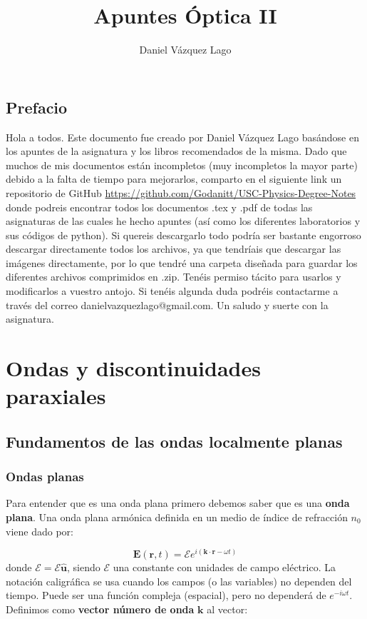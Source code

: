 \documentclass[12pt,a4paper]{book}
\title{Apuntes Óptica II}
\author{Daniel Vázquez Lago}
\numberwithin{equation}{section}
\numberwithin{figure}{section}
\newcommand{\1}{_{(1)}}
\newcommand{\2}{_{(2)}}
\newcommand{\un}{\mathbf{u}}
\newcommand{\rn}{\mathbf{r}}
\newcommand{\kn}{\mathbf{k}}
\newcommand{\En}{\mathbf{E}}
\newcommand{\Encal}{\boldsymbol{\mathcal{E}}}
\newcommand{\hnu}{\hat{\un}}
\theoremstyle{definition}
\begin{document}
\maketitle

\newpage

\tableofcontents

\newpage
\section*{Prefacio}

Hola a todos. Este documento fue creado por Daniel Vázquez Lago basándose en los apuntes de la asignatura y los libros recomendados de la misma. Dado que muchos de mis documentos están incompletos (muy incompletos la mayor parte) debido a la falta de tiempo para mejorarlos, comparto en el siguiente link un repositorio de GitHub \url{https://github.com/Godanitt/USC-Physics-Degree-Notes} donde podreis encontrar todos los documentos .tex y .pdf de todas las asignaturas de las cuales he hecho apuntes (así como los diferentes laboratorios y sus códigos de python). Si quereis descargarlo todo podría ser bastante engorroso descargar directamente todos los archivos, ya que tendríais que descargar las imágenes directamente, por lo que tendré una carpeta diseñada para guardar los diferentes archivos comprimidos en .zip. Tenéis permiso tácito para usarlos y modificarlos a vuestro antojo. Si tenéis algunda duda podréis contactarme a través del correo danielvazquezlago@gmail.com. Un saludo y suerte con la asignatura.

\newpage
\chapter{Ondas y discontinuidades paraxiales}

\section{Fundamentos de las ondas localmente planas}
\subsection{Ondas planas}

Para entender que es una onda plana primero debemos saber que es una \textbf{onda plana}. Una onda plana armónica definida en un medio de índice de refracción $n_0$ viene dado por:

\begin{equation}
\En (\rn,t) = \Encal  e^{i (\kn \cdot \rn - \omega t)}
\end{equation}
donde $ \Encal = \mathcal{E} \hnu$, siendo $\mathcal{E}$ una constante con unidades de campo eléctrico. La notación caligráfica se usa cuando los campos (o las variables) no dependen del tiempo. Puede ser una función compleja (espacial), pero no dependerá de $e^{-i \omega t}$. Definimos como \textbf{vector número de onda} $\kn$ al vector:
\end{document}
